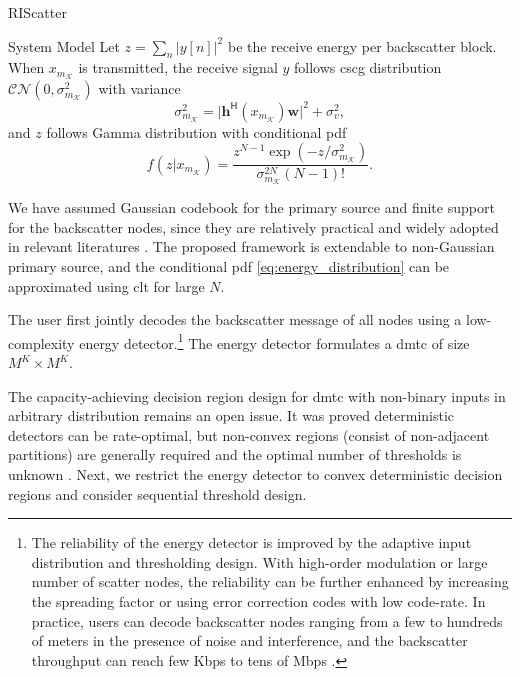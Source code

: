 \begin{section}{RIScatter}
\begin{subsection}{System Model}
		Let $z=\sum_{n} \bigl\lvert y[n] \bigr\rvert^2$ be the receive energy per backscatter block.
		When $x_{m_\mathcal{K}}$ is transmitted, the receive signal $y$ follows \gls{cscg} distribution $\mathcal{CN}(0,\sigma_{m_{\mathcal{K}}}^2)$ with variance
		\begin{equation}
			\sigma_{m_{\mathcal{K}}}^2 = \lvert \mathbf{h}^\mathsf{H}(x_{m_{\mathcal{K}}}) \mathbf{w} \rvert^2 + \sigma_v^2,
			\label{eq:receive_variance}
		\end{equation}
		and $z$ follows Gamma distribution with conditional \gls{pdf}
		\begin{equation}
			f(z|x_{m_{\mathcal{K}}}) = \frac{z^{N-1} \exp(-z/\sigma_{m_{\mathcal{K}}}^2)}{\sigma_{m_{\mathcal{K}}}^{2N} (N-1)!}.
			\label{eq:energy_distribution}
		\end{equation}

		\begin{remark}
			We have assumed Gaussian codebook for the primary source and finite support for the backscatter nodes, since they are relatively practical and widely adopted in relevant literatures \cite{Qian2019b,Xu2020b,Zhang2021d,Hua2022,Hu2021a,Qian2019}.
			The proposed framework is extendable to non-Gaussian primary source, and the conditional \gls{pdf} \eqref{eq:energy_distribution} can be approximated using \gls{clt} for large $N$.
			\label{rm:non_gaussian}
		\end{remark}

		The user first jointly decodes the backscatter message of all nodes using a low-complexity energy detector.\footnote{The reliability of the energy detector is improved by the adaptive input distribution and thresholding design. With high-order modulation or large number of scatter nodes, the reliability can be further enhanced by increasing the spreading factor or using error correction codes with low code-rate. In practice, users can decode backscatter nodes ranging from a few to hundreds of meters in the presence of noise and interference, and the backscatter throughput can reach few Kbps to tens of Mbps \cite{Wu2022e}.\label{fn:energy_detector}}
		The energy detector formulates a \gls{dmtc} of size $M^K \times M^K$.

		\begin{remark}
			The capacity-achieving decision region design for \gls{dmtc} with non-binary inputs in arbitrary distribution remains an open issue.
			It was proved deterministic detectors can be rate-optimal, but non-convex regions (consist of non-adjacent partitions) are generally required and the optimal number of thresholds is unknown \cite{Nguyen2018,Nguyen2021}.
			Next, we restrict the energy detector to convex deterministic decision regions and consider sequential threshold design.
		\end{remark}


\end{subsection}
\end{section}
